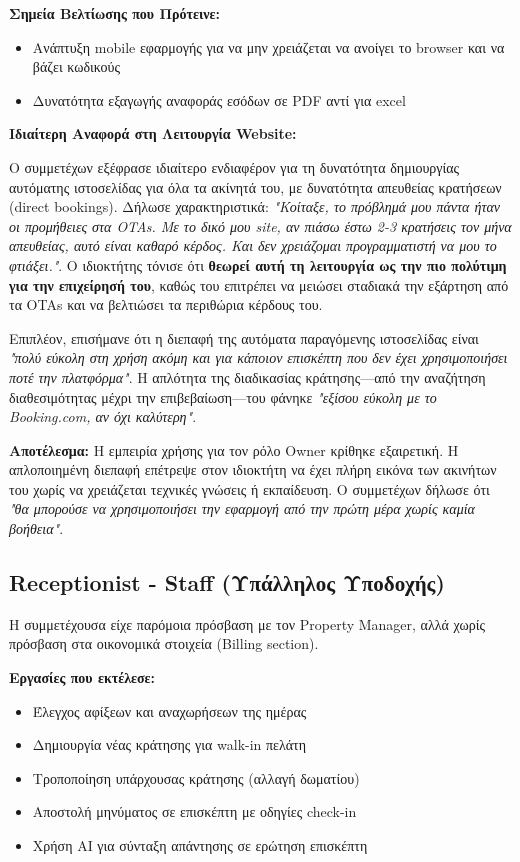 \documentclass[
	12pt, %
	oneside, %
	greek,
	onehalfspacing, %
	liststotoc, %
	toctotoc, %
	parskip, %
	headsepline, %
]{MastersDoctoralThesis} %
\begin{document}
\textbf{Σημεία Βελτίωσης που Πρότεινε:}
\begin{itemize}
    \item Ανάπτυξη mobile εφαρμογής για να μην χρειάζεται να ανοίγει το browser και να βάζει κωδικούς
    \item Δυνατότητα εξαγωγής αναφοράς εσόδων σε PDF αντί για excel
\end{itemize}

\textbf{Ιδιαίτερη Αναφορά στη Λειτουργία Website:}

Ο συμμετέχων εξέφρασε ιδιαίτερο ενδιαφέρον για τη δυνατότητα δημιουργίας αυτόματης ιστοσελίδας για όλα τα ακίνητά του, με δυνατότητα απευθείας κρατήσεων (direct bookings). Δήλωσε χαρακτηριστικά: \textit{"Κοίταξε, το πρόβλημά μου πάντα ήταν οι προμήθειες στα OTAs. Με το δικό μου site, αν πιάσω έστω 2-3 κρατήσεις τον μήνα απευθείας, αυτό είναι καθαρό κέρδος. Και δεν χρειάζομαι προγραμματιστή να μου το φτιάξει."}. Ο ιδιοκτήτης τόνισε ότι \textbf{θεωρεί αυτή τη λειτουργία ως την πιο πολύτιμη για την επιχείρησή του}, καθώς του επιτρέπει να μειώσει σταδιακά την εξάρτηση από τα OTAs και να βελτιώσει τα περιθώρια κέρδους του.

Επιπλέον, επισήμανε ότι η διεπαφή της αυτόματα παραγόμενης ιστοσελίδας είναι \textit{"πολύ εύκολη στη χρήση ακόμη και για κάποιον επισκέπτη που δεν έχει χρησιμοποιήσει ποτέ την πλατφόρμα"}. Η απλότητα της διαδικασίας κράτησης---από την αναζήτηση διαθεσιμότητας μέχρι την επιβεβαίωση---του φάνηκε \textit{"εξίσου εύκολη με το Booking.com, αν όχι καλύτερη"}.

\textbf{Αποτέλεσμα:} Η εμπειρία χρήσης για τον ρόλο Owner κρίθηκε εξαιρετική. Η απλοποιημένη διεπαφή επέτρεψε στον ιδιοκτήτη να έχει πλήρη εικόνα των ακινήτων του χωρίς να χρειάζεται τεχνικές γνώσεις ή εκπαίδευση. Ο συμμετέχων δήλωσε ότι \textit{"θα μπορούσε να χρησιμοποιήσει την εφαρμογή από την πρώτη μέρα χωρίς καμία βοήθεια"}.

\subsection{Receptionist - Staff (Υπάλληλος Υποδοχής)}

Η συμμετέχουσα είχε παρόμοια πρόσβαση με τον Property Manager, αλλά χωρίς πρόσβαση στα οικονομικά στοιχεία (Billing section).

\textbf{Εργασίες που εκτέλεσε:}
\begin{itemize}
    \item Έλεγχος αφίξεων και αναχωρήσεων της ημέρας
    \item Δημιουργία νέας κράτησης για walk-in πελάτη
    \item Τροποποίηση υπάρχουσας κράτησης (αλλαγή δωματίου)
    \item Αποστολή μηνύματος σε επισκέπτη με οδηγίες check-in
    \item Χρήση AI για σύνταξη απάντησης σε ερώτηση επισκέπτη
\end{itemize}
\end{document}
